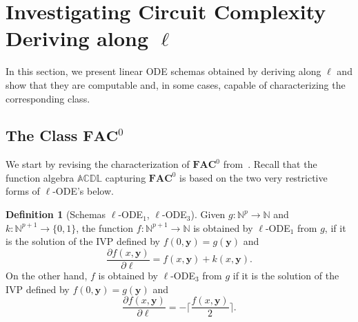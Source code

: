 \documentclass[11pt, oneside]{article}
\newcommand{\ACDL}{\mathbb{ACDL}}
\newcommand{\Nat}{\mathbb{N}}
\newcommand{\AC}{\mathbf{FAC}}
\newcommand{\tu}[1]{\mathbf{#1}}
\theoremstyle{definition}
\newtheorem{defn}{Definition}
\begin{document}
\section{Investigating Circuit Complexity Deriving along $\ell$}\label{sec:alongL}

In this section, we present linear ODE schemas obtained by deriving along $\ell$ and show that they are computable and, in some cases, capable of characterizing the corresponding class.



























\subsection{The Class $\AC^0$}\label{sec:AC}

We start by revising the characterization of $\AC^0$ from~\cite{ADK24a}.
%
Recall that the function algebra $\ACDL$ capturing $\AC^0$ is based on the two very restrictive forms of $\ell$-ODE's below.

\begin{defn}[Schemas $\ell$-ODE$_1$, $\ell$-ODE$_3$]
    Given $g:\Nat^p\to \Nat$ and $k:\Nat^{p+1} \to \{0,1\}$, the function $f:\Nat^{p+1} \to \Nat$ is obtained by $\ell$-ODE$_1$ from $g$, if it is the solution of the IVP defined by  $f(0, \tu y)=g(\tu y)$ and 
    $$
    \frac{\partial f(x, \tu y)}{\partial \ell} = f(x, \tu y)+ k(x, \tu y).
    $$
    On the other hand, $f$ is obtained by $\ell$-ODE$_3$ from $g$ if it is the solution of the IVP defined by  $f(0, \tu y)=g(\tu y)$ and
    $$
    \frac{\partial f(x, \tu y)}{\partial \ell}=-\bigg\lceil \frac{f(x, \tu y)}{2}\bigg\rceil.
    $$
\end{defn}
\end{document}
